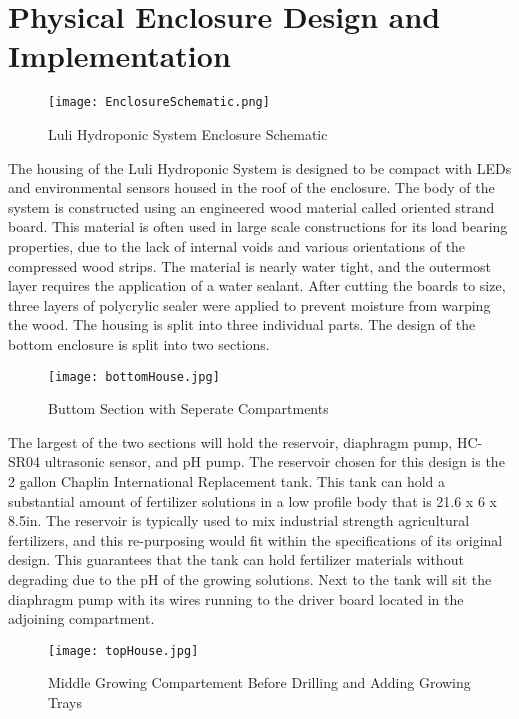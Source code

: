 \documentclass[12pt]{article} %
\begin{document}
\section{Physical Enclosure Design and Implementation}

\begin{figure}[H]
  \centering
  \texttt{[image: EnclosureSchematic.png]}
  \caption{Luli Hydroponic System Enclosure Schematic}
  \label{fig: housing schematic}
\end{figure}

The housing of the Luli Hydroponic System is designed to be compact with LEDs and environmental sensors housed in the roof of the enclosure. The body of the system is constructed using an engineered wood material called oriented strand board. This material is often used in large scale constructions for its load bearing properties, due to the lack of internal voids and various orientations of the compressed wood strips. The material is nearly water tight, and the outermost layer requires the application of a water sealant. After cutting the boards to size, three layers of polycrylic sealer were applied to prevent moisture from warping the wood. The housing is split into three individual parts. The design of the bottom enclosure is split into two sections. 

\begin{figure}[H]
  \centering
  \texttt{[image: bottomHouse.jpg]}
  \caption{Buttom Section with Seperate Compartments}
  \label{fig:bottom compartment}
\end{figure}


The largest of the two sections will hold the reservoir, diaphragm pump, HC-SR04 ultrasonic sensor, and pH pump. The reservoir chosen for this design is the 2 gallon Chaplin International Replacement tank. This tank can hold a substantial amount of fertilizer solutions in a low profile body that is 21.6 x 6 x 8.5in. The reservoir is typically used to mix industrial strength agricultural fertilizers, and this re-purposing would fit within the specifications of its original design. This guarantees that the tank can hold fertilizer materials without degrading due to the pH of the growing solutions. Next to the tank will sit the diaphragm pump with its wires running to the driver board located in the adjoining compartment.

\begin{figure}[H]
  \centering
  \texttt{[image: topHouse.jpg]}
  \caption{Middle Growing Compartement Before Drilling and Adding Growing Trays}
  \label{fig:mid Housing}
\end{figure}
\end{document}
